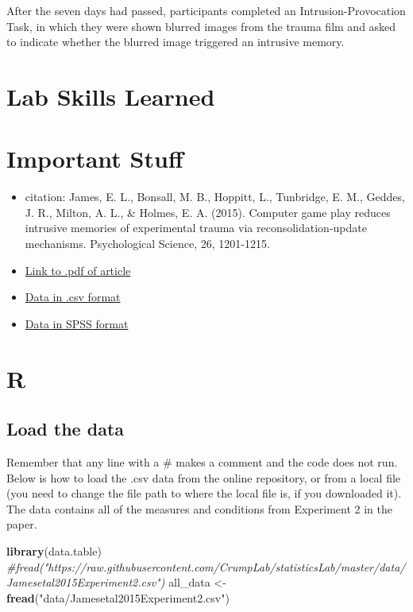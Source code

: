 \documentclass[]{book}
\newenvironment{Shaded}{\begin{snugshade}}{\end{snugshade}}
\newcommand{\KeywordTok}[1]{\textcolor[rgb]{0.13,0.29,0.53}{\textbf{{#1}}}}
\newcommand{\StringTok}[1]{\textcolor[rgb]{0.31,0.60,0.02}{{#1}}}
\newcommand{\CommentTok}[1]{\textcolor[rgb]{0.56,0.35,0.01}{\textit{{#1}}}}
\newcommand{\NormalTok}[1]{{#1}}
\providecommand{\tightlist}{%
  \setlength{\itemsep}{0pt}\setlength{\parskip}{0pt}}
\theoremstyle{definition}
\theoremstyle{definition}
\theoremstyle{definition}
\theoremstyle{remark}
\begin{document}
After the seven days had passed, participants completed an
Intrusion-Provocation Task, in which they were shown blurred images from
the trauma film and asked to indicate whether the blurred image
triggered an intrusive memory.

\section{Lab Skills Learned}\label{lab-skills-learned-2}

\section{Important Stuff}\label{important-stuff-2}

\begin{itemize}
\tightlist
\item
  citation: James, E. L., Bonsall, M. B., Hoppitt, L., Tunbridge, E. M.,
  Geddes, J. R., Milton, A. L., \& Holmes, E. A. (2015). Computer game
  play reduces intrusive memories of experimental trauma via
  reconsolidation-update mechanisms. Psychological Science, 26,
  1201-1215.
\item
  \href{http://journals.sagepub.com/stoken/default+domain/hQ2W4fbPrZVJ7eyNJaqu/full}{Link
  to .pdf of article}
\item
  \href{https://drive.google.com/open?id=0Bz-rhZ21ShvOM1cxWUpUNlQ0UlE}{Data
  in .csv format}
\item
  \href{https://drive.google.com/file/d/0Bz-rhZ21ShvOZ1lvQ0dQekZGWU0/view?usp=sharing}{Data
  in SPSS format}
\end{itemize}

\section{R}\label{r-8}

\subsection{Load the data}\label{load-the-data-1}

Remember that any line with a \# makes a comment and the code does not
run. Below is how to load the .csv data from the online repository, or
from a local file (you need to change the file path to where the local
file is, if you downloaded it). The data contains all of the measures
and conditions from Experiment 2 in the paper.

\begin{Shaded}
\begin{Highlighting}[]
\KeywordTok{library}\NormalTok{(data.table)}
\CommentTok{#fread("https://raw.githubusercontent.com/CrumpLab/statisticsLab/master/data/Jamesetal2015Experiment2.csv")}
\NormalTok{all_data <-}\StringTok{ }\KeywordTok{fread}\NormalTok{(}\StringTok{"data/Jamesetal2015Experiment2.csv"}\NormalTok{)}
\end{Highlighting}
\end{Shaded}
\end{document}
